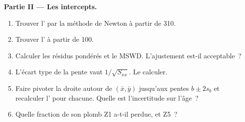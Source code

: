 \begin{problem}
\medskip\noindent\textbf{Partie II --- Les intercepts.}
\begin{enumerate}[resume]
\item Trouver l' par la méthode de Newton à partir de \qty{310}{\Ma}.
\item Trouver l' à partir de \qty{100}{\Ma}.
\item Calculer les résidus pondérés et le MSWD. L'ajustement est-il acceptable~?
\item L'écart type de la pente vaut $1/\sqrt{S_{xx}}$. Le calculer.
\item Faire pivoter la droite autour de $(\bar x, \bar y)$ jusqu'aux pentes $b \pm 2s_b$ et
recalculer l' pour chacune. Quelle est l'incertitude sur l'âge~?
\item Quelle fraction de son plomb Z1 a-t-il perdue, et Z5~?
\end{enumerate}


\end{problem}
